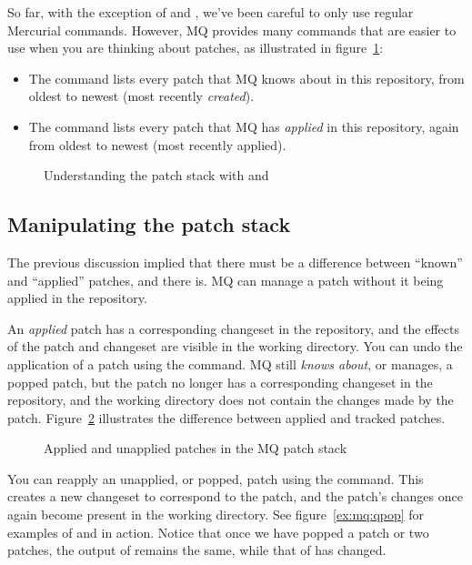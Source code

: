 So far, with the exception of  and , we've
been careful to only use regular Mercurial commands.  However, MQ
provides many commands that are easier to use when you are thinking
about patches, as illustrated in figure~\ref{ex:mq:qseries}:

\begin{itemize}
\item The  command lists every patch that MQ knows
  about in this repository, from oldest to newest (most recently
  \emph{created}).
\item The  command lists every patch that MQ has
  \emph{applied} in this repository, again from oldest to newest (most
  recently applied).
\end{itemize}

\begin{figure}[ht]
  \caption{Understanding the patch stack with  and
    }
  \label{ex:mq:qseries}
\end{figure}

\subsection{Manipulating the patch stack}

The previous discussion implied that there must be a difference
between ``known'' and ``applied'' patches, and there is.  MQ can
manage a patch without it being applied in the repository.

An \emph{applied} patch has a corresponding changeset in the
repository, and the effects of the patch and changeset are visible in
the working directory.  You can undo the application of a patch using
the  command.  MQ still \emph{knows about}, or manages, a
popped patch, but the patch no longer has a corresponding changeset in
the repository, and the working directory does not contain the changes
made by the patch.  Figure~\ref{fig:mq:stack} illustrates the
difference between applied and tracked patches.

\begin{figure}[ht]
  \centering
  \caption{Applied and unapplied patches in the MQ patch stack}
  \label{fig:mq:stack}
\end{figure}

You can reapply an unapplied, or popped, patch using the 
command.  This creates a new changeset to correspond to the patch, and
the patch's changes once again become present in the working
directory.  See figure~\ref{ex:mq:qpop} for examples of 
and  in action.  Notice that once we have popped a patch
or two patches, the output of  remains the same, while
that of  has changed.


